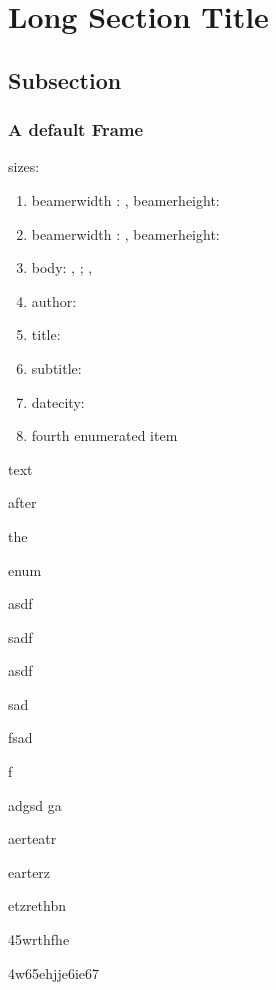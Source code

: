\documentclass[german,aspectratio=169,notoc]{tudbeamer}%
\begin{document}
\section[ShortSection]{Long Section Title}	
\subsection{Subsection}
\begin{frame}[allowframebreaks]
	\frametitle{A default Frame}
	sizes:
	\begin{enumerate}
		\item beamerwidth : \the\paperwidth, beamerheight: \the\paperheight
		\item beamerwidth : \number\paperwidth, beamerheight:\number\paperheight
		\item body: \the\bodyx, \the\bodyy; \the\bodywidth, \the\bodywidth
		\item author: \insertauthor
		\item title: \inserttitle
		\item subtitle: \insertsubtitle
		\item datecity: \insertdatecity
		\item fourth enumerated item
	\end{enumerate}
	text 

	after 

	the 

	enum

	asdf

	sadf
	
	asdf
	
	sad
	
	fsad
	
	f

	adgsd
	ga

	aerteatr

	earterz

	etzrethbn

	45wrthfhe

	4w65ehjje6ie67
\end{frame}
\end{document}

